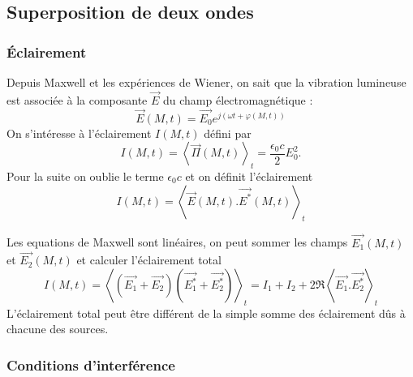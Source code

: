 \subsection{Superposition de deux ondes}

\subsubsection{Éclairement}

Depuis Maxwell et les expériences de Wiener, on sait que la vibration lumineuse est associée à la composante $\overrightarrow{E}$ du champ électromagnétique :
\begin{equation}
\overrightarrow{E}(M,t) = \overrightarrow{E_0}e^{j(\omega t +\varphi(M,t))}
\end{equation}
On s'intéresse à l'éclairement $I(M,t)$ défini par
\begin{equation}
I(M,t) = \left< \overrightarrow{\Pi}(M,t)\right>_t = \frac{\epsilon_0 c}{2}E_0^2.
\end{equation}
Pour la suite on oublie le terme $\epsilon_0 c$ et on définit l'éclairement
\begin{equation}
I(M,t) = \left< \overrightarrow{E}(M,t).\overrightarrow{E^*}(M,t)\right>_t
\end{equation}

Les equations de Maxwell sont linéaires, on peut sommer les champs $\overrightarrow{E_1}(M,t)$ et $\overrightarrow{E_2}(M,t)$ et calculer l'éclairement total
\begin{equation}
I(M,t) = \left< (\overrightarrow{E_1} + \overrightarrow{E_2})(\overrightarrow{E_1^*} + \overrightarrow{E_2^*}) \right>_t = I_1 + I_2 + 2\Re\left< \overrightarrow{E_1}.\overrightarrow{E_2^*} \right>_t 
\end{equation}
L'éclairement total peut être différent de la simple somme des éclairement dûs à chacune des sources.

\subsubsection{Conditions d'interférence}


